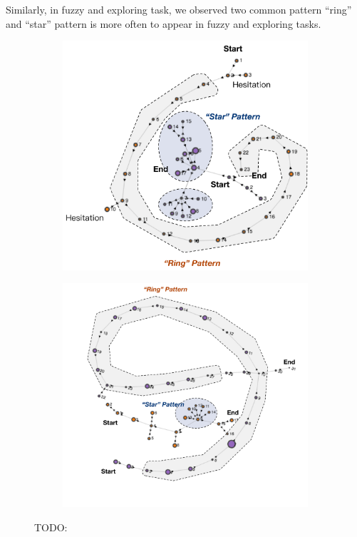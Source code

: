 Similarly, in fuzzy and exploring task, we observed two common pattern ``ring'' and ``star''
pattern is more often to appear in fuzzy and exploring tasks.

\begin{figure}[H]
    \centering
    \begin{subfigure}[b]{0.60\textwidth}
        \includegraphics[width=1\textwidth]{figures/vis-patterns1}
        \caption{}
        \label{fig:vis-fuzzy-explore1}
    \end{subfigure}
    \begin{subfigure}[b]{0.60\textwidth}
        \includegraphics[width=1\textwidth]{figures/vis-patterns2}
        \caption{}
        \label{fig:vis-fuzzy-explore2}
    \end{subfigure}
    \caption{TODO:}
    \label{fig:vis-fuzzy-explore}
\end{figure}

